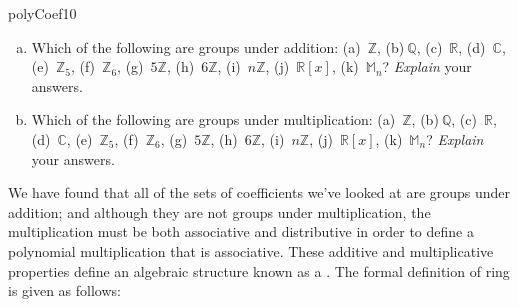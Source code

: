 \begin{exercise}{polyCoef10}
\begin{enumerate}[(a)]
\item
Which of the following are groups under addition: (a)~$\mathbb{Z}$,  (b)$~\mathbb{Q}$,  (c)~$\mathbb{R}$,  (d)~$\mathbb{C}$,  (e)~$\mathbb{Z}_5$,  (f)~$\mathbb{Z}_6$,  (g)~$5\mathbb{Z}$,   (h)~$6\mathbb{Z}$,   (i)~$n\mathbb{Z}$, (j)~$\mathbb{R}[x]$,  (k)~$\mathbb{M}_n$? \emph{Explain} your answers.

\item
Which of the following are groups under multiplication: (a)~$\mathbb{Z}$,  (b)$~\mathbb{Q}$,  (c)~$\mathbb{R}$,  (d)~$\mathbb{C}$,  (e)~$\mathbb{Z}_5$,  (f)~$\mathbb{Z}_6$,  (g)~$5\mathbb{Z}$,   (h)~$6\mathbb{Z}$,   (i)~$n\mathbb{Z}$, (j)~$\mathbb{R}[x]$,  (k)~$\mathbb{M}_n$? \emph{Explain} your answers.

\end{enumerate}
\end{exercise}

We have found that all of the sets of coefficients we've looked at are groups under addition; and although they are not groups under multiplication,  the multiplication must be both associative and distributive in order to define a polynomial multiplication that is associative.
These additive and multiplicative properties define an algebraic structure known as a . The formal definition of ring is given as follows:   

